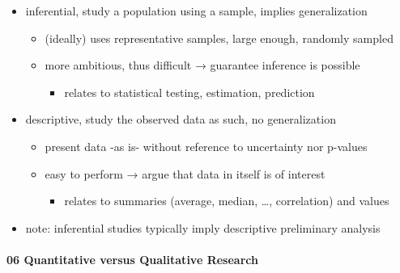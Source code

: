 \documentclass[
]{article}
\providecommand{\tightlist}{%
  \setlength{\itemsep}{0pt}\setlength{\parskip}{0pt}}
\begin{document}
\begin{itemize}
\tightlist
\item
  inferential, study a population using a sample, implies generalization

  \begin{itemize}
  \tightlist
  \item
    (ideally) uses representative samples, large enough, randomly
    sampled
  \item
    more ambitious, thus difficult → guarantee inference is possible

    \begin{itemize}
    \tightlist
    \item
      relates to statistical testing, estimation, prediction
    \end{itemize}
  \end{itemize}
\item
  descriptive, study the observed data as such, no generalization

  \begin{itemize}
  \tightlist
  \item
    present data -as is- without reference to uncertainty nor p-values
  \item
    easy to perform → argue that data in itself is of interest

    \begin{itemize}
    \tightlist
    \item
      relates to summaries (average, median, \ldots, correlation) and
      values
    \end{itemize}
  \end{itemize}
\item
  note: inferential studies typically imply descriptive preliminary
  analysis
\end{itemize}

\hypertarget{quantitative-versus-qualitative-research}{%
\paragraph{06 Quantitative versus Qualitative
Research}\label{quantitative-versus-qualitative-research}}
\end{document}
